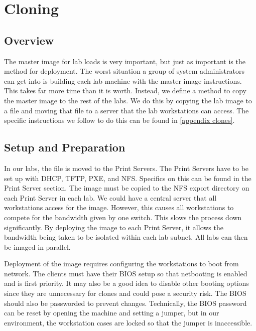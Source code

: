 \section{Cloning} \label{sec:cloning}
\subsection{Overview}
The master image for lab loads is very important, but just as important is the method for deployment.  The worst situation a group of system administrators can get into is building each lab machine with the master image instructions.  This takes far more time than it is worth.  Instead, we define a method to copy the master image to the rest of the labs.  We do this by copying the lab image to a file and moving that file to a server that the lab workstations can access.  The specific instructions we follow to do this can be found in \ref{appendix clones}.
\subsection{Setup and Preparation}
In our labs, the file is moved to the Print Servers.  The Print Servers have to be set up with DHCP, TFTP, PXE, and NFS.  Specifics on this can be found in the Print Server section.  The image must be copied to the NFS export directory on each Print Server in each lab.  We could have a central server that all workstations access for the image.  However, this causes all workstations to compete for the bandwidth given by one switch.  This slows the process down significantly.  By deploying the image to each Print Server, it allows the bandwidth being taken to be isolated within each lab subnet.  All labs can then be imaged in parallel.  

Deployment of the image requires configuring the workstations to boot from network.  The clients must have their BIOS setup so that netbooting is enabled and is first priority.  It may also be a good idea to disable other booting options since they are unnecessary for clones and could pose a security risk.  The BIOS should also be passworded to prevent changes.  Technically, the BIOS password can be reset by opening the machine and setting a jumper, but in our environment, the workstation cases are locked so that the jumper is inaccessible.  
